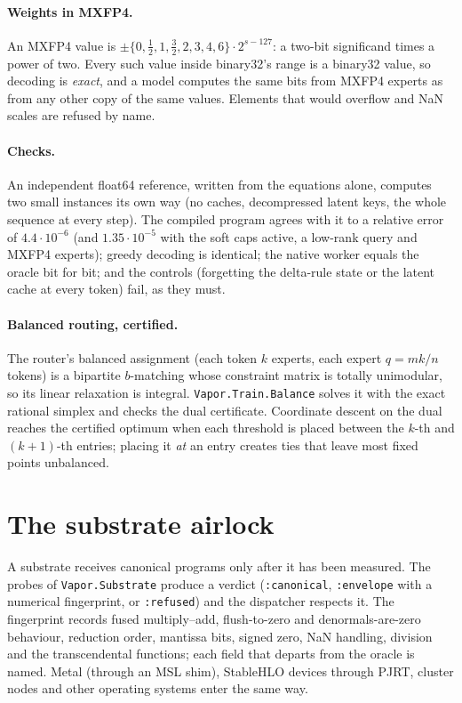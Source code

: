 \paragraph{Weights in MXFP4.} An MXFP4 value is $\pm\{0, \tfrac12, 1, \tfrac32, 2, 3, 4, 6\}\cdot
2^{s-127}$: a two-bit significand times a power of two. Every such value inside binary32's range is a
binary32 value, so decoding is \emph{exact}, and a model computes the same bits from MXFP4 experts as
from any other copy of the same values. Elements that would overflow and NaN scales are refused by name.

\paragraph{Checks.} An independent float64 reference, written from the equations alone, computes two
small instances its own way (no caches, decompressed latent keys, the whole sequence at every step). The
compiled program agrees with it to a relative error of $4.4\cdot10^{-6}$ (and $1.35\cdot10^{-5}$ with
the soft caps active, a low-rank query and MXFP4 experts); greedy decoding is identical; the native worker
equals the oracle bit for bit; and the controls (forgetting the delta-rule state or the latent cache at
every token) fail, as they must.

\paragraph{Balanced routing, certified.} The router's balanced assignment (each token $k$ experts, each
expert $q = mk/n$ tokens) is a bipartite $b$-matching whose constraint matrix is totally unimodular, so
its linear relaxation is integral. \texttt{Vapor.Train.Balance} solves it with the exact rational simplex
and checks the dual certificate. Coordinate descent on the dual reaches the certified optimum when each
threshold is placed between the $k$-th and $(k{+}1)$-th entries; placing it \emph{at} an entry creates
ties that leave most fixed points unbalanced.

\section{The substrate airlock}

A substrate receives canonical programs only after it has been measured. The probes of
\texttt{Vapor.Substrate} produce a verdict (\texttt{:canonical}, \texttt{:envelope} with a numerical
fingerprint, or \texttt{:refused}) and the dispatcher respects it. The fingerprint records fused
multiply--add, flush-to-zero and denormals-are-zero behaviour, reduction order, mantissa bits, signed
zero, NaN handling, division and the transcendental functions; each field that departs from the oracle is
named. Metal (through an MSL shim), StableHLO devices through PJRT, cluster nodes and other operating
systems enter the same way.

